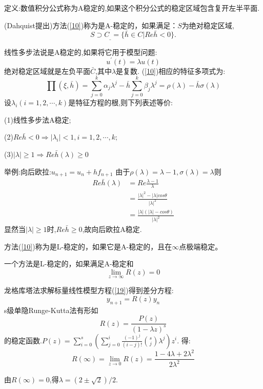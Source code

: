 \documentclass[12pt,a4paper]{article}
\begin{document}
定义:数值积分公式称为A稳定的,如果这个积分公式的稳定区域包含复开左半平面.

(Dahquist提出)方法(\ref{10})称为是A-稳定的，如果满足：$S$为绝对稳定区域,
\begin{equation*}
S\supset C_{\_}=\{\bar{h}\in C|Re\bar{h}<0\}.
\end{equation*}

线性多步法说是A稳定的,如果将它用于模型问题:
\begin{equation}
u^{'}(t)=\lambda u(t)
\label{19}
\end{equation}
绝对稳定区域就是左负平面$\bar{C}$,其中$\lambda$是复数.
(\ref{10})相应的特征多项式为:
\begin{equation}
\prod(\xi,\bar{h})=\sum_{j=0}^{k}\alpha_{j}\lambda^{j}-\bar{h}\sum_{j=0}^{k}\beta_{j}\lambda^{j}=\rho(\lambda)-\bar{h}\sigma(\lambda)
\end{equation}
设$\lambda_{i}(i=1,2,\cdots,k)$是特征方程的根,则下列表述等价:

(1)线性多步法A稳定;

(2)$Re\bar{h}<0\Rightarrow|\lambda_{i}|<1,i=1,2,\cdots,k;$

(3)$|\lambda|\ge 1\Rightarrow Re\bar{h}(\lambda)\ge 0$

举例:向后欧拉:$u_{n+1}=u_{n}+hf_{n+1}$
由于$\rho(\lambda)=\lambda-1,\sigma(\lambda)=\lambda$则
\begin{align}
Re\bar{h}(\lambda)&=Re\frac{\lambda-1}{\lambda}\\&=\frac{|\lambda|^2-|\lambda|cos\theta}{|\lambda|^2}\\&=\frac{|\lambda|(|\lambda|-cos\theta)}{|\lambda|^2}
\end{align}
显然当$|\lambda|\ge 1$时,$Re\bar{h}\ge 0$,故向后欧拉A稳定.

方法(\ref{10})称为是L-稳定的，如果它是A-稳定的，且在$\infty$点极端稳定。

一个方法是L-稳定的，如果满足A-稳定和
\begin{equation*}
\lim\limits_{z\to\infty}R(z)=0
\end{equation*}

龙格库塔法求解标量线性模型方程(\ref{19})得到差分方程:
\begin{equation}
y_{n+1}=R(z)y_{n}
\end{equation}
s级单隐Runge-Kutta法有形如
\begin{equation}
R(z)=\frac{P(z)}{(1-\lambda z)^s}
\end{equation}
的稳定函数.$P(z)=\sum_{i=0}^{s}(\sum_{j=0}^{i}\frac{(-1)^j}{(i-j)!}\binom{s}{j}\lambda^j)z^i$.
得:
\begin{equation}
R(\infty)=\lim\limits_{z\to 0}R(z)=\frac{1-4\lambda+2\lambda^2}{2\lambda^2}
\end{equation}

由$R(\infty)=0$,得$\lambda=(2\pm\sqrt{2})/2$.


\cite{tam19912d}
%
\end{document}

